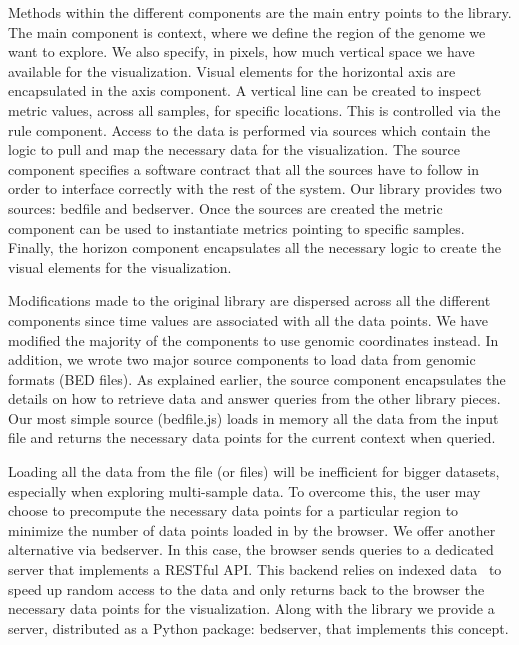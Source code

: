 \documentclass{bioinfo}
\begin{document}

Methods within the different components are the main entry points to the
library. The main component is context, where we define the region of the
genome we want to explore. We also specify, in pixels, how much vertical space
we have available for the visualization. Visual elements for the horizontal
axis are encapsulated in the axis component. A vertical line can be created to
inspect metric values, across all samples, for specific locations. This is
controlled via the rule component. Access to the data is performed via sources
which contain the logic to pull and map the necessary data for the
visualization. The source component specifies a software contract that all the
sources have to follow in order to interface correctly with the rest of the
system. Our library provides two sources: bedfile and bedserver. Once the
sources are created the metric component can be used to instantiate metrics
pointing to specific samples. Finally, the horizon component encapsulates all
the necessary logic to create the visual elements for the visualization.

Modifications made to the original library are dispersed across all the
different components since time values are associated with all the data points.
We have modified the majority of the components to use genomic coordinates
instead. In addition, we wrote two major source components to load data from
genomic formats (BED files). As explained earlier, the source component
encapsulates the details on how to retrieve data and answer queries from the
other library pieces. Our most simple source (bedfile.js) loads in memory all
the data from the input file and returns the necessary data points for the
current context when queried.

Loading all the data from the file (or files) will be inefficient for bigger
datasets, especially when exploring multi-sample data. To overcome this, the
user may choose to precompute the necessary data points for a particular region
to minimize the number of data points loaded in by the browser. We offer
another alternative via bedserver. In this case, the browser sends queries to a
dedicated server that implements a RESTful API. This backend relies on indexed
data~\citep{tabix-li} to speed up random access to the data and only returns
back to the browser the necessary data points for the visualization.  Along
with the library we provide a server, distributed as a Python package:
bedserver, that implements this concept.
\end{document}
